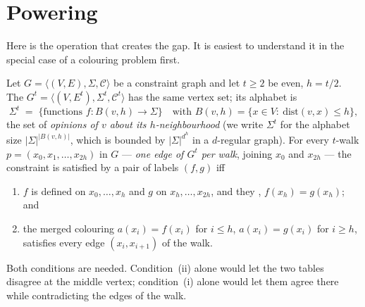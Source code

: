 \section{Powering}
\label{sec:power}

Here is the operation that creates the gap.  It is easiest to understand it in the special case of a colouring problem first.

\begin{definition}\label{def:power}
Let $G=\langle(V,E),\Sigma,\mathcal C\rangle$ be a constraint graph and let $t\ge2$ be even, $h=t/2$.
The  $G^t=\langle(V,E^t),\Sigma^t,\mathcal C^t\rangle$ has the same vertex set; its alphabet is
\[
  \Sigma^t\;=\;\Big\{\text{functions }f\colon B(v,h)\to\Sigma\Big\}\quad\text{with }B(v,h)=\{x\in V:\ \mathrm{dist}(v,x)\le h\},
\]
the set of \emph{opinions of $v$ about its $h$-neighbourhood} (we write $\Sigma^t$ for the alphabet size $|\Sigma|^{|B(v,h)|}$, which is bounded by $|\Sigma|^{d^{h}}$ in a $d$-regular graph).
For every $t$-walk $p=(x_0,x_1,\dots,x_{2h})$ in $G$ --- \emph{one edge of $G^t$ per walk}, joining $x_0$ and $x_{2h}$ --- the constraint is satisfied by a pair of labels $(f,g)$ iff
\begin{enumerate}[label=(\roman*),leftmargin=*]
  \item $f$ is defined on $x_0,\dots,x_h$ and $g$ on $x_h,\dots,x_{2h}$, and they , $f(x_h)=g(x_h)$; and
  \item the merged colouring $a(x_i)=f(x_i)$ for $i\le h$, $a(x_i)=g(x_i)$ for $i\ge h$, satisfies every edge $(x_i,x_{i+1})$ of the walk.
\end{enumerate}
\end{definition}

\noindent
Both conditions are needed.  Condition~(ii) alone would let the two tables disagree at the middle vertex; condition~(i) alone would let them agree there while contradicting the edges of the walk.

